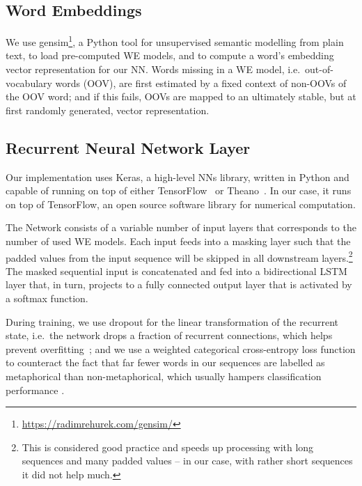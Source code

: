 \documentclass[11pt,a4paper]{article}
\begin{document}
\subsection{Word Embeddings} %

We use gensim\footnote{\url{https://radimrehurek.com/gensim/}}, a Python tool for unsupervised semantic modelling from plain text, to load pre-computed WE models, and to compute a word's embedding vector representation for our {NN}.
Words missing in a WE model, i.e.~out-of-vocabulary words (OOV), are first estimated by a fixed context of non-OOVs of the OOV word;
and if this fails, OOVs are mapped to an ultimately stable, but at first randomly generated, vector representation.


\subsection{Recurrent Neural Network Layer} %

Our implementation uses Keras, a high-level NNs library, written in Python and
capable of running on top of either TensorFlow~\cite{tensorflow2016} or Theano~\cite{chollet2015}. 
In our case, it runs on top of TensorFlow, an open source software library for numerical computation.

The Network consists of a variable number of input layers that corresponds to the number of used WE models. 
Each input feeds into a masking layer such that the padded values from the input sequence will be skipped in all downstream layers.\footnote{This is considered good practice and speeds up processing with long sequences and many padded values -- in our case, with rather short sequences it did not help much.}
The masked sequential input is concatenated and fed into a bidirectional LSTM layer that, in turn, projects to a fully connected output layer that is activated by a softmax function.

During training, we use dropout for the linear transformation of the recurrent state, i.e.~the network drops a fraction of recurrent connections, 
which helps prevent overfitting~\cite{Srivastava2014}; 
and we use a weighted categorical cross-entropy loss function to counteract the fact that far fewer words in our sequences are labelled as metaphorical than non-metaphorical, which usually hampers classification performance \cite[cf.][]{Kotsiantis2006HandlingReview}.
\end{document}
